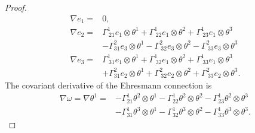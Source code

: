 \documentclass{article}
\theoremstyle{definition}
\theoremstyle{remark}
\begin{document}
\begin{proof}
\begin{equation}
\begin{aligned}
        \nabla e_1 =& 0, \\
        \nabla e_2 =& \Gamma^1_{~21} e_1 \otimes \theta^1 + \Gamma^1_{~22} e_1 \otimes \theta^2 + \Gamma^1_{~23} e_1 \otimes \theta^3 \\ 
        & -\Gamma^2_{31} e_3 \otimes \theta^1 - \Gamma^2_{~32} e_3 \otimes \theta^2 - \Gamma^2_{~33} e_3 \otimes \theta^3 \\
        \nabla e_3 =& \Gamma^1_{~31} e_1 \otimes \theta^1 + \Gamma^1_{~32} e_1 \otimes \theta^2 + \Gamma^1_{~33} e_1 \otimes \theta^3  \\ 
        &+ \Gamma^2_{31} e_2 \otimes \theta^1 + \Gamma^2_{~32} e_2 \otimes \theta^2 + \Gamma^2_{~33} e_2 \otimes \theta^3.
    \end{aligned} \label{eqn:Thm32a} \end{equation}
    \noindent The covariant derivative of the Ehresmann connection is 
    \begin{equation} \begin{aligned}
        \nabla \omega = \nabla \theta^1 =& -\Gamma^1_{21} \theta^2 \otimes \theta^1 - \Gamma^1_{22} \theta^2 \otimes \theta^2 - \Gamma^1_{23} \theta^2 \otimes \theta^3 \\ 
        &- \Gamma^1_{31} \theta^3 \otimes \theta^1 - \Gamma^1_{32} \theta^3 \otimes \theta^2 - \Gamma^1_{33} \theta^3 \otimes \theta^3.  
    \end{aligned} \label{eqn:Thm32b} \end{equation}
    

\end{proof}
\end{document}
